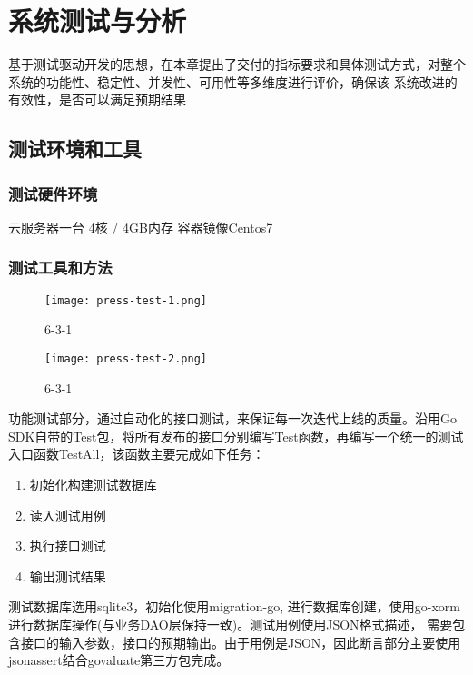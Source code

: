 
\chapter{系统测试与分析}
基于测试驱动开发的思想，在本章提出了交付的指标要求和具体测试方式，对整个系统的功能性、稳定性、并发性、可用性等多维度进行评价，确保该
系统改进的有效性，是否可以满足预期结果

\section{测试环境和工具}

\subsection{测试硬件环境}
云服务器一台
4核 / 4GB内存
容器镜像Centos7

\subsection{测试工具和方法}

\begin{figure}[H]
    \centering
    \texttt{[image: press-test-1.png]}
    \caption{6-3-1}
    \label{fig:6-1-1}
\end{figure}

\begin{figure}[H]
    \centering
    \texttt{[image: press-test-2.png]}
    \caption{6-3-1}
    \label{fig:6-1-2}
\end{figure}

功能测试部分，通过自动化的接口测试，来保证每一次迭代上线的质量\cite{zw3}。沿用Go SDK自带的Test包，将所有发布的接口分别编写Test函数，再编写一个统一的测试
入口函数TestAll，该函数主要完成如下任务：
\begin{enumerate}
    \item 初始化构建测试数据库
    \item 读入测试用例
    \item 执行接口测试
    \item 输出测试结果
\end{enumerate}

测试数据库选用sqlite3，初始化使用migration-go, 进行数据库创建，使用go-xorm进行数据库操作(与业务DAO层保持一致)。测试用例使用JSON格式描述，
需要包含接口的输入参数，接口的预期输出。由于用例是JSON，因此断言部分主要使用jsonassert结合govaluate第三方包完成。

